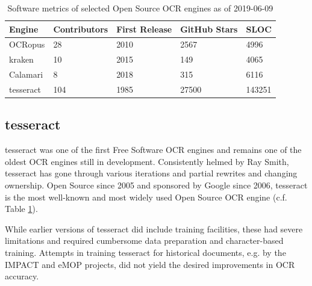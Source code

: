 \documentclass[sigconf]{acmart}
\begin{document}

\begin{table}[b]
\begin{tabular}{lllll}
\hline
Engine    & Contributors & First Release & GitHub Stars & SLOC \\ \hline
OCRopus   & 28           & 2010          & 2567         & 4996 \\
kraken    & 10           & 2015          & 149          & 4065 \\
Calamari  & 8            & 2018          & 315          & 6116 \\
tesseract & 104          & 1985          & 27500        & 143251 \\

\end{tabular}
\caption{Software metrics of selected Open Source OCR engines as of 2019-06-09}
\label{tab:stats}
\end{table}

\subsection{tesseract}

tesseract \cite{4376991} was one of the first Free Software OCR
engines \cite{Rice1995TheFA} and remains one of the oldest OCR engines still in
development. Consistently helmed by Ray Smith, tesseract has gone
through various iterations and partial rewrites and changing
ownership. Open Source since 2005 and sponsored by Google since
2006, tesseract is the most well-known and most widely used Open
Source OCR engine (c.f. Table \ref{tab:stats}).

While earlier versions of tesseract did include training facilities, 
these had severe limitations and required cumbersome data preparation and
character-based training. Attempts in training tesseract for historical documents, e.g.
by the IMPACT \cite{PSNC} and eMOP \cite{doi:10.1093/llc/fqv062} projects, did not yield 
the desired improvements in OCR accuracy.
\end{document}
